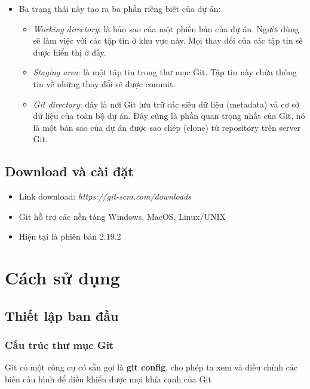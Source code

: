 \documentclass[12pt,a4paper]{report}
\begin{document}
\begin{itemize}
\item Ba trạng thái này tạo ra ba phần riêng biệt của dự án:
	\begin{itemize}
		\item {\it Working directory}: là bản sao của một phiên bản của dự án. Người dùng sẽ làm việc với các tập tin ở khu vực này. Mọi thay đổi của các tập tin sẽ được hiển thị ở đây.
		\item {\it Staging area}: là một tập tin trong thư mục Git. Tập tin này chứa thông tin về những thay đổi sẽ được commit.
		\item {\it Git directory}: đây là nơi Git lưu trữ các siêu dữ liệu (metadata) và cơ sở dữ liệu của toàn bộ dự án. Đây cũng là phần quan trọng nhất của Git, nó là một bản sao của dự án được sao chép (clone) từ repository trên server Git.
		\end{itemize}
\end{itemize}
\newpage
\section{Download và cài đặt}


\begin{itemize}
\item Link download: {\it https://git-scm.com/downloads }
\item Git hỗ trợ các nền tảng Windows, MacOS, Linux/UNIX
\item Hiện tại là phiên bản 2.19.2
\end{itemize}


\newpage %





\chapter{Cách sử dụng} 


\section{Thiết lập ban đầu} 
\subsection{Cấu trúc thư mục Git}  

Git có một công cụ có sẵn gọi là \textbf{git config}, cho phép ta xem và điều chỉnh các biến cấu hình để điều khiển được mọi khía cạnh của Git 
\end{document}
